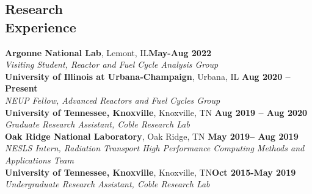 \documentclass[margin,line]{resume}
\begin{document}
\begin{resume}
    \section{\mysidestyle Research\\Experience}
    \textbf{Argonne National Lab}, Lemont, IL\hfill\textbf{May-Aug 2022}\\
    \vspace{-5mm}
                \textsl{Visiting Student, Reactor and Fuel Cycle Analysis Group}\\
        
    \textbf{University of Illinois at Urbana-Champaign}, Urbana, IL \hfill \textbf{Aug 2020 -- Present} \\
    \vspace{-5mm}
        \textsl{NEUP Fellow, Advanced Reactors and Fuel Cycles Group} \\
        
    \textbf{University of Tennessee, Knoxville}, Knoxville, TN \hfill \textbf{Aug 2019 -- Aug 2020}\\
    \vspace{-5mm}
        \textsl{Graduate Research Assistant, Coble Research Lab} \\ 
    
    \textbf{Oak Ridge National Laboratory}, Oak Ridge, TN \hfill \textbf{May 2019-- Aug 2019}\\
    \vspace{-5mm}        
        \textsl{NESLS Intern, Radiation Transport High Performance Computing Methods and Applications Team}\\               
    
    \textbf{University of Tennessee, Knoxville}, Knoxville, TN\hfill\textbf{Oct 2015-May 2019}\\
        \vspace{-5mm}            
        \textsl{Undergraduate Research Assistant, Coble Research Lab}\\

    


\end{resume}
\end{document}

